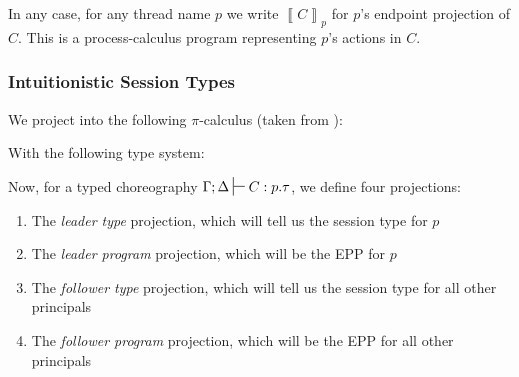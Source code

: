 \documentclass{article}
\theoremstyle{definition}
\newcommand{\proves}[1][]{\sststile{}{#1}}
\newcommand{\transb}[1]{\left\llbracket #1 \right\rrbracket}
\begin{document}
In any case, for any thread name $p$ we write $\transb{C}_p$ for $p$'s endpoint projection of $C$.
This is a process-calculus program representing $p$'s actions in $C$.

\subsubsection{Intuitionistic Session Types}
We project into the following $\pi$-calculus (taken from \citet{ToninhoCP12}):
\begin{syntax}
  \alternative{[y \leftrightarrow x]}
\end{syntax}
With the following type system:

Now, for a typed choreography $\Gamma; \Delta \proves C : p.\tau$, we define four projections:
\begin{enumerate}
\item The \emph{leader type} projection, which will tell us the session type for $p$
\item The \emph{leader program} projection, which will be the EPP for $p$
\item The \emph{follower type} projection, which will tell us the session type for all other principals
\item The \emph{follower program} projection, which will be the EPP for all other principals
\end{enumerate}
\end{document}
